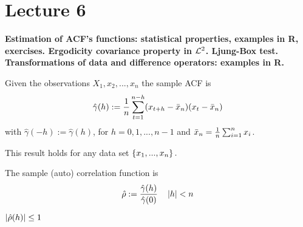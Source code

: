 \section{Lecture 6}
\label{lecture6}

\begin{center}
    \textbf{Estimation of ACF's functions: statistical properties, examples in R, exercises. Ergodicity covariance property in $\mathcal{L}^{2}$. Ljung-Box test.  Transformations of data and difference operators: examples in R.}
\end{center}

\begin{definition}
    Given the observations $X_1,x_2,...,x_n$ the sample ACF is
    \[
        \hat{\gamma}(h):=\frac{1}{n}\sum_{t=1}^{n-h}(x_{t+h}-\bar{x}_n)(x_t-\bar{x}_n)  
    \]
    with $\hat{\gamma}(-h):=\hat{\gamma}(h)$, for $h=0,1,...,n-1$ and $\bar{x}_n=\frac{1}{n}\sum_{i=1}^nx_i$.
\end{definition}

\begin{remark}
    This result holds for any data set $\left\{x_1,...,x_n\right\}.$
\end{remark}

\begin{definition}
    The sample (auto) correlation function is
    \[
        \hat{\rho}:=\frac{\hat{\gamma}(h)}{\hat{\gamma}(0)}\ \ \ \abs{h}<n  
    \]
\end{definition}

\begin{remark}
    $\left|\hat{\rho}(h)\right|\le1$
\end{remark}

